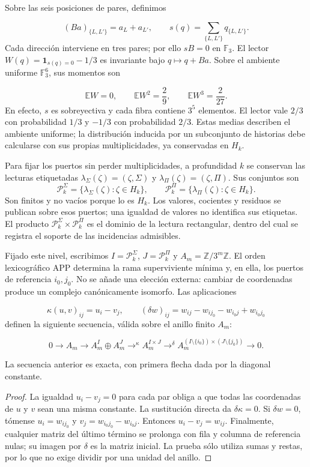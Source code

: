 Sobre las seis posiciones de pares, definimos

\[
(Ba)_{\{L,L'\}}=a_L+a_{L'},
\qquad
s(q)=\sum_{\{L,L'\}}q_{\{L,L'\}}.
\]
Cada dirección interviene en tres pares; por ello \(sB=0\) en \(\mathbb F_3\). El lector \(W(q)=\mathbf1_{s(q)=0}-1/3\) es invariante bajo \(q\mapsto q+Ba\). Sobre el ambiente uniforme \(\mathbb F_3^6\), sus momentos son

\[
\mathbb EW=0,\qquad
\mathbb EW^2=\frac29,\qquad
\mathbb EW^3=\frac2{27}.
\]
En efecto, \(s\) es sobreyectiva y cada fibra contiene \(3^5\) elementos. El lector vale \(2/3\) con probabilidad \(1/3\) y \(-1/3\) con probabilidad \(2/3\). Estas medias describen el ambiente uniforme; la distribución inducida por un subconjunto de historias debe calcularse con sus propias multiplicidades, ya conservadas en \(H_k\).

Para fijar los puertos sin perder multiplicidades, a profundidad \(k\) se
conservan las lecturas etiquetadas
\(\lambda_\Sigma(\zeta)=(\zeta,\Sigma)\) y
\(\lambda_\Pi(\zeta)=(\zeta,\Pi)\). Sus conjuntos son
\[
\mathscr P_k^\Sigma=\{\lambda_\Sigma(\zeta):\zeta\in H_k\},\qquad
\mathscr P_k^\Pi=\{\lambda_\Pi(\zeta):\zeta\in H_k\}.
\]
Son finitos y no vacíos porque lo es \(H_k\). Los valores, cocientes y residuos
se publican sobre esos puertos; una igualdad de valores no identifica sus
etiquetas. El producto \(\mathscr P_k^\Sigma\times\mathscr P_k^\Pi\) es el
dominio de la lectura rectangular, dentro del cual se registra el soporte de
las incidencias admisibles.

Fijado este nivel, escribimos \(I=\mathscr P_k^\Sigma\),
\(J=\mathscr P_k^\Pi\) y \(A_m=\mathbb Z/3^m\mathbb Z\). El orden
lexicográfico APP determina la rama superviviente mínima y, en ella, los
puertos de referencia \(i_0,j_0\). No se añade una elección externa: cambiar
de coordenadas produce un complejo canónicamente isomorfo. Las aplicaciones

\[
\kappa(u,v)_{ij}=u_i-v_j,
\qquad
(\delta w)_{ij}=w_{ij}-w_{ij_0}-w_{i_0j}+w_{i_0j_0}
\]
definen la siguiente secuencia, válida sobre el anillo finito \(A_m\):

\[
0\longrightarrow A_m\longrightarrow
A_m^I\oplus A_m^J\mathrel{\mathop{\longrightarrow}^{\kappa}}
A_m^{I\times J}\mathrel{\mathop{\longrightarrow}^{\delta}}
A_m^{(I\setminus\{i_0\})\times(J\setminus\{j_0\})}
\longrightarrow0.
\]
\begin{proposition}
\label{prop:continuo-exactitud-rectangular}
La secuencia anterior es exacta, con primera flecha dada por la diagonal constante.
\end{proposition}
\begin{proof}
La igualdad \(u_i-v_j=0\) para cada par obliga a que todas las coordenadas de \(u\) y \(v\) sean una misma constante. La sustitución directa da \(\delta\kappa=0\). Si \(\delta w=0\), tómense \(u_i=w_{ij_0}\) y \(v_j=w_{i_0j_0}-w_{i_0j}\). Entonces \(u_i-v_j=w_{ij}\). Finalmente, cualquier matriz del último término se prolonga con fila y columna de referencia nulas; su imagen por \(\delta\) es la matriz inicial. La prueba sólo utiliza sumas y restas, por lo que no exige dividir por una unidad del anillo.
\end{proof}

